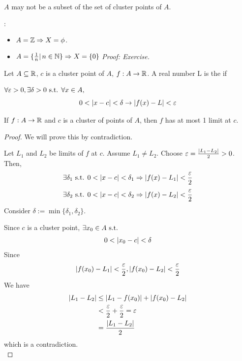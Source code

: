 \documentclass[a4paper,12pt]{article}
\begin{document}
\begin{theorem}
    \begin{remark}
        \(A\) may not be a subset of the set of cluster points of \(A\).
        \begin{example}:
            \begin{itemize}
                \item \(A=\mathbb{Z}\Rightarrow X=\phi\).
                \item \(A=\{\frac{1}{n }|\,n\in\mathbb{N} \}\Rightarrow X=\{0\}\) \textit{Proof: Exercise.}\\
            \end{itemize}
        \end{example}
    \end{remark}
\end{theorem}

\begin{definition}
    Let \(A\subseteq\mathbb{R}\), \(c\) is a cluster point of \(A\), \(f:A\rightarrow\mathbb{R}\). A real number L is the  if 

    \(\forall \varepsilon>0, \exists\delta>0 \text{ s.t. } \forall x\in A,\)
    \[0<\left\lvert x-c \right\rvert<\delta \rightarrow \left\lvert f(x)-L\right\rvert<\varepsilon\]
\end{definition}

\begin{theorem}
    If \(f:A\rightarrow \mathbb{R}\) and \(c \) is a cluster of points of \(A \), then \(f \) has at most 1 limit at \(c \).
    \begin{proof}
        We will prove this by contradiction.

        Let \(L_1\) and \(L_2\) be limits of \(f \) at \(c \). Assume \(L_1\neq L_2 \). Choose \(\varepsilon=\frac{\left\lvert L_1-L_2\right\rvert}{2}>0\). Then,
        \[\exists \delta_1\text{ s.t. } 0<\left\lvert x-c\right\rvert<\delta_1\Rightarrow\left\lvert f(x)-L_1\right\rvert<\frac{\varepsilon}{2}\]
        \[\exists \delta_2\text{ s.t. } 0<\left\lvert x-c\right\rvert<\delta_2\Rightarrow\left\lvert f(x)-L_2\right\rvert<\frac{\varepsilon}{2}\]
        Consider \(\delta:=\min\{\delta_1,\delta_2\}\). 

        Since \(c\) is a cluster point, \(\exists x_0\in A\text{ s.t. }\) 
        \[0<\left\lvert x_0-c\right\rvert<\delta\]
        Since \[\left\lvert f(x_0)-L_1\right\rvert<\frac{\varepsilon}{2},\left\lvert f(x_0)-L_2\right\rvert<\frac{\varepsilon}{2}\]
        We have 
        \begin{align*}
            \left\lvert L_1-L_2\right\rvert&\le \left\lvert L_1-f(x_0)\right\rvert+\left\lvert f(x_0)-L_2\right\rvert\\
            &<\frac{\varepsilon}{2}+\frac{\varepsilon}{2}=\varepsilon\\
            &=\frac{\left\lvert L_1-L_2\right\rvert}{2}
        \end{align*}
        which is a contradiction.\\
    \end{proof}
\end{theorem}
\end{document}
